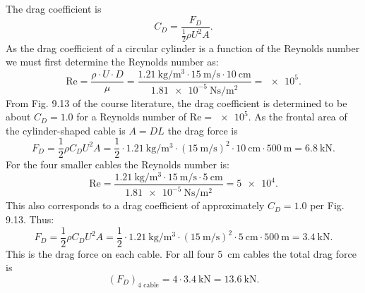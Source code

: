 \begin{derivation}
  The drag coefficient is 
  \begin{equation*}
    C_D = \frac{F_D}{\frac{1}{2} \rho U^2 A}
  .\end{equation*}
  As the drag coefficient of a circular cylinder is a function of the Reynolds number we must first determine the Reynolds number as:
  \begin{equation*}
    \mathrm{Re} = \frac{\rho \cdot U \cdot D}{\mu} = \frac{\qty{1,21}{\kg\per\cubic\m} \cdot \qty{15}{\m\per\s} \cdot \qty{10}{\cm}}{\qty{1,81e-5}{\N\s\per\square\m}} = \num{e5} 
  .\end{equation*}
  From Fig. 9.13 of the course literature, the drag coefficient is determined to be about $C_D = \num{1,0}$ for a Reynolds number of $\mathrm{Re} = \num{e5}$.
  As the frontal area of the cylinder-shaped cable is $A = DL$ the drag force is
  \begin{equation*}
    F_D = \frac{1}{2} \rho C_D U^2 A = \frac{1}{2} \cdot \qty{1,21}{\kg\per\cubic\m} \cdot \left( \qty{15}{\m\per\s}  \right)^2 \cdot \qty{10}{\cm} \cdot \qty{500}{\m}  = \qty{6,8}{\kN} 
  .\end{equation*}
  For the four smaller cables the Reynolds number is:
  \begin{equation*}
    \mathrm{Re} = \frac{\qty{1,21}{\kg\per\cubic\m} \cdot \qty{15}{\m\per\s} \cdot \qty{5}{\cm} }{\qty{1,81e-5}{\N\s\per\square\m}} = \num{5e4} 
  .\end{equation*}
  This also corresponds to a drag coefficient of approximately $C_D = \num{1,0}$ per Fig. 9.13.
  Thus:
  \begin{equation*}
    F_D = \frac{1}{2} \rho C_D U^2 A = \frac{1}{2} \cdot \qty{1,21}{\kg\per\cubic\m} \cdot \left( \qty{15}{\m\per\s}  \right)^2 \cdot \qty{5}{\cm} \cdot \qty{500}{\m} = \qty{3,4}{\kN} 
  .\end{equation*}
  This is the drag force on each cable.
  For all four \qty{5}{\cm}  cables the total drag force is
  \begin{equation*}
    \left( F_{D} \right)_{\text{4 cable}} = 4 \cdot \qty{3,4}{\kN} = \qty{13,6}{\kN} 
  .\end{equation*}
\end{derivation}

